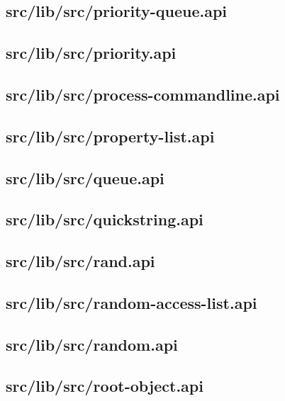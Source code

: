 \subsection{src/lib/src/priority-queue.api}


\subsection{src/lib/src/priority.api}


\subsection{src/lib/src/process-commandline.api}


\subsection{src/lib/src/property-list.api}


\subsection{src/lib/src/queue.api}


\subsection{src/lib/src/quickstring.api}


\subsection{src/lib/src/rand.api}


\subsection{src/lib/src/random-access-list.api}


\subsection{src/lib/src/random.api}


\subsection{src/lib/src/root-object.api}


